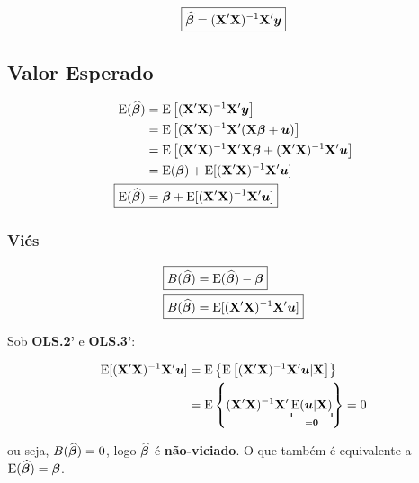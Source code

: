 \documentclass[11pt, oneside, a4paper, article]{article}
\numberwithin{equation}{section}
\begin{document}
\vspace{-2 em}
\begin{equation} \label{betahat:ols}
	\boxed{ \widehat{\boldsymbol{\beta}} = (\mathbf{X}'\mathbf{X})^{-1}\mathbf{X}'\boldsymbol{y} }
\end{equation}

\subsection{Valor Esperado} 

\vspace{-2 em}
\begin{align*} 
\E ( \widehat{\mbs{\beta}} ) 
&= \E \left[ (\Xmat'\Xmat)^{-1}\Xmat'\mbs{y} \right]
\\
&= \E \left[ (\Xmat'\Xmat)^{-1}\Xmat'(\Xmat \mbs{\beta} + \mbs{u}) \right]
\\
&= \E \left[ (\Xmat'\Xmat)^{-1}\Xmat'\Xmat \mbs{\beta} + (\Xmat'\Xmat)^{-1}\Xmat'\mbs{u} \right]
\\
&= \E (\mbs{\beta}) + \E[(\Xmat'\Xmat)^{-1}\Xmat'\mbs{u} ]
\\
\Aboxed{
\E ( \widehat{\mbs{\beta}} ) 
&= \mbs{\beta} + \E[(\Xmat'\Xmat)^{-1}\Xmat'\mbs{u} ] }
\end{align*}

\subsubsection{Viés} 

\vspace{-2 em}
\begin{align*} 
\Aboxed{ B( \widehat{\mbs{\beta}} ) &= \E ( \widehat{\mbs{\beta}} ) - \mbs{\beta} }
\\
\Aboxed{ B( \widehat{\mbs{\beta}} ) &= \E[ (\Xmat'\Xmat)^{-1}\Xmat'\mbs{u} ] }
\end{align*}

\begin{remark}
Sob \textbf{OLS.2'} e \textbf{OLS.3'}:

\vspace{-1 em}
\begin{align*}
\E[(\Xmat'\Xmat)^{-1}\Xmat'\mbs{u} ]
&= \E \left\{ \E\left[ (\Xmat'\Xmat)^{-1}\Xmat'\mbs{u} | \Xmat \right]  \right\}  
\\
&= \E \left\{  (\Xmat'\Xmat)^{-1}\Xmat'
\underbracket[.75pt]{\E( \mbs{u} | \Xmat )}_{= \mbs{0}}
\right\} = 0
\end{align*}

\noindent
ou seja, 
$B( \widehat{\boldsymbol{\beta}} ) = 0$, logo $\widehat{\boldsymbol{\beta}}$ é \textbf{não-viciado}.
O que também é equivalente a  $\text{E}( \widehat{\boldsymbol{\beta}} ) = \boldsymbol{\beta}$.
\end{remark}
\end{document}
